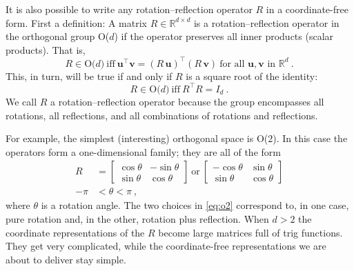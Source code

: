 \documentclass{article}
\newcommand{\Evec}[1]{{\mathbf{#1}}} %
\begin{document}
It is also possible to write any rotation--reflection operator $R$ in a coordinate-free form.
First a definition: A matrix $R\in\mathbb{R}^{d\times d}$ is a rotation--reflection operator in the orthogonal group O($d$) if the operator preserves all inner products (scalar products).
That is,
\begin{equation}
    R \in \mbox{O($d$)} ~ \mbox{iff} ~ \Evec{u}^\top\Evec{v}=(R\,\Evec{u})^\top(R\,\Evec{v}) ~ \mbox{for all $\Evec{u},\Evec{v}$ in $\mathbb{R}^d$} ~.\label{eq:orth1}
\end{equation}
This, in turn, will be true if and only if $R$ is a square root of the identity:
\begin{equation}
    R \in \mbox{O($d$)} ~ \mbox{iff} ~ R^\top R=I_d ~.\label{eq:orth2}
\end{equation}
We call $R$ a rotation--reflection operator because the group encompasses all rotations, all reflections, and all combinations of rotations and reflections.

For example, the simplest (interesting) orthogonal space is O($2$). In this case the operators form a one-dimensional family; they are all of the form
\begin{align}
    R &= \begin{bmatrix}\cos{\theta} & -\sin{\theta} \\ \sin{\theta} & \cos{\theta}\end{bmatrix} ~\mbox{or}~
    \begin{bmatrix}-\cos{\theta} & \sin{\theta} \\ \sin{\theta} & \cos{\theta}\end{bmatrix} \label{eq:o2}
    \\
    -\pi &< \theta < \pi ~, \nonumber
\end{align}
where $\theta$ is a rotation angle.
The two choices in \eqref{eq:o2} correspond to, in one case, pure rotation and, in the other, rotation plus reflection.
When $d>2$ the coordinate representations of the $R$ become large matrices full of trig functions.
They get very complicated, while the coordinate-free representations we are about to deliver stay simple.
\end{document}
